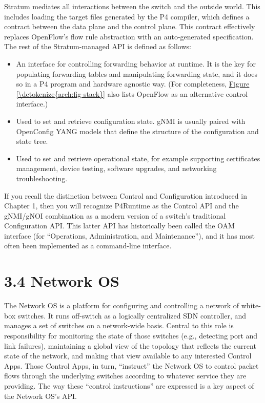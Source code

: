 \documentclass[letterpaper,11pt,english]{sphinxmanual}
\begin{document}
Stratum mediates all interactions between the switch and the outside
world. This includes loading the target files generated by the P4
compiler, which defines a contract between the data plane and the
control plane. This contract effectively replaces OpenFlow’s flow rule
abstraction with an auto-generated specification. The rest of the
Stratum-managed API is defined as follows:
\begin{itemize}
\item {} 
 An interface for controlling forwarding behavior at
runtime. It is the key for populating forwarding tables and
manipulating forwarding state, and it does so in a P4 program and
hardware agnostic way. (For completeness, \hyperref[\detokenize{arch:fig-stack}]{Figure \ref{\detokenize{arch:fig-stack}}} also lists OpenFlow as an alternative control interface.)

\item {} 
 Used to set and
retrieve configuration state. gNMI is usually paired with OpenConfig
YANG models that define the structure of the configuration and state
tree.

\item {} 
 Used to set and
retrieve operational state, for example supporting certificates
management, device testing, software upgrades, and networking
troubleshooting.

\end{itemize}

If you recall the distinction between Control and Configuration
introduced in Chapter 1, then you will recognize P4Runtime as the
Control API and the gNMI/gNOI combination as a modern version of a
switch’s traditional Configuration API. This latter API has
historically been called the OAM interface (for “Operations,
Administration, and Maintenance”), and it has most often been
implemented as a command-line interface.


\section{3.4 Network OS}
\label{\detokenize{arch:network-os}}
The Network OS is a platform for configuring and controlling a network
of white-box switches. It runs off-switch as a logically centralized
SDN controller, and manages a set of switches on a network-wide
basis. Central to this role is responsibility for monitoring the state
of those switches (e.g., detecting port and link failures),
maintaining a global view of the topology that reflects the current
state of the network, and making that view available to any interested
Control Apps. Those Control Apps, in turn, “instruct” the Network OS
to control packet flows through the underlying switches according to
whatever service they are providing. The way these “control
instructions” are expressed is a key aspect of the Network OS’s API.
\end{document}
